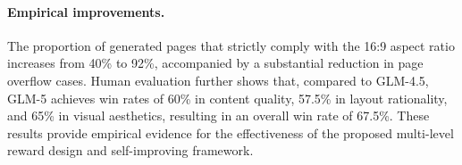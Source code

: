 \paragraph{Empirical improvements.}
The proportion of generated pages that strictly comply with the 16:9 aspect ratio increases from 40\% to 92\%, accompanied by a substantial reduction in page overflow cases. Human evaluation further shows that, compared to GLM-4.5, GLM-5 achieves win rates of 60\% in content quality, 57.5\% in layout rationality, and 65\% in visual aesthetics, resulting in an overall win rate of 67.5\%. These results provide empirical evidence for the effectiveness of the proposed multi-level reward design and self-improving framework.

